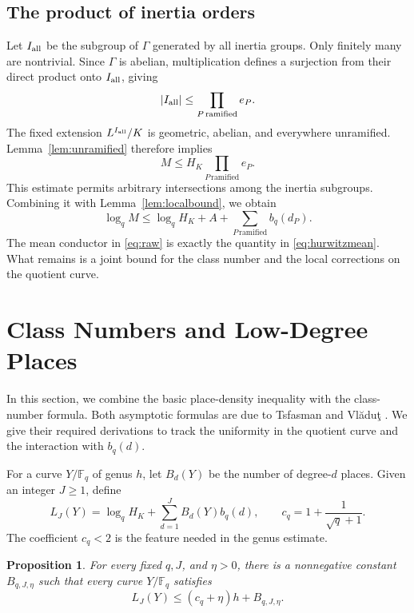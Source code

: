 \documentclass[12pt,onecolumn,draftclsnofoot,letterpaper]{IEEEtran}
\newtheorem{proposition}{Proposition}
\theoremstyle{remark}
\newcommand{\F}{\mathbb F}
\begin{document}
\subsection{The product of inertia orders}
Let $I_{\rm all}$ be the subgroup of $\Gamma$ generated by all inertia groups. Only finitely many are nontrivial. Since $\Gamma$ is abelian, multiplication defines a surjection from their direct product onto $I_{\rm all}$, giving
\[
 |I_{\rm all}|\le\prod_{P\,\mathrm{ramified}}e_P.
\]
The fixed extension $L^{I_{\rm all}}/K$ is geometric, abelian, and everywhere unramified. Lemma~\ref{lem:unramified} therefore implies
\begin{equation}
 M\le H_K\prod_{P\,\mathrm{ramified}}e_P.
 \label{eq:product}
\end{equation}
This estimate permits arbitrary intersections among the inertia subgroups. Combining it with Lemma~\ref{lem:localbound}, we obtain
\begin{equation}
 \log_qM\le\log_qH_K+A+
 \sum_{P\,\mathrm{ramified}}b_q(d_P).
 \label{eq:raw}
\end{equation}
The mean conductor in \eqref{eq:raw} is exactly the quantity in \eqref{eq:hurwitzmean}. What remains is a joint bound for the class number and the local corrections on the quotient curve.

\section{Class Numbers and Low-Degree Places}\label{sec:class}
In this section, we combine the basic place-density inequality with the class-number formula. Both asymptotic formulas are due to Tsfasman and Vl\u{a}du\c{t} \cite[Cor.~A$'$ and Cor.~D$'$]{tv}. We give their required derivations to track the uniformity in the quotient curve and the interaction with $b_q(d)$.

For a curve $Y/\F_q$ of genus $h$, let $B_d(Y)$ be the number of degree-$d$ places. Given an integer $J\ge1$, define
\begin{equation}
 L_J(Y)=\log_qH_K+\sum_{d=1}^JB_d(Y)b_q(d),
 \qquad c_q=1+\frac1{\sqrt q+1}.
 \label{eq:LJ}
\end{equation}
The coefficient $c_q<2$ is the feature needed in the genus estimate.
\begin{proposition}\label{prop:joint}
For every fixed $q,J$, and $\eta>0$, there is a nonnegative constant $B_{q,J,\eta}$ such that every curve $Y/\F_q$ satisfies
\begin{equation}
 L_J(Y)\le(c_q+\eta)h+B_{q,J,\eta}.
 \label{eq:joint}
\end{equation}
\end{proposition}
\end{document}
